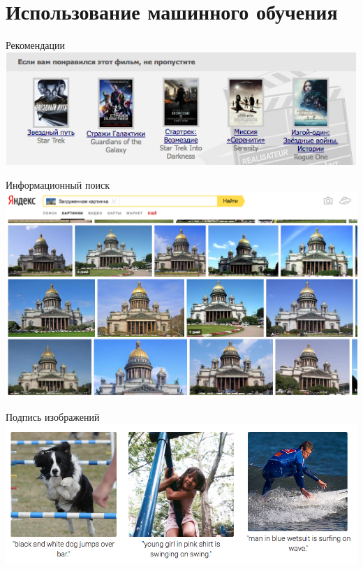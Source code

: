 \documentclass[10pt]{beamer}
\begin{document}
\section{Использование машинного обучения}

{
\begin{frame}{Рекомендации}
  \centering
  \includegraphics[width=0.9 \linewidth, height=0.9 \textheight, keepaspectratio]{images/recommendations}\\
\end{frame}
}

{
\begin{frame}{Информационный поиск}
  \centering
  \includegraphics[width=0.9 \linewidth, height=0.9 \textheight, keepaspectratio]{images/similar_image}\\
\end{frame}
}

{
\begin{frame}{Подпись изображений}
  \centering
  \includegraphics[width=0.9 \linewidth, height=0.9 \textheight, keepaspectratio]{images/image_captioning}\\
\end{frame}
}
\end{document}
